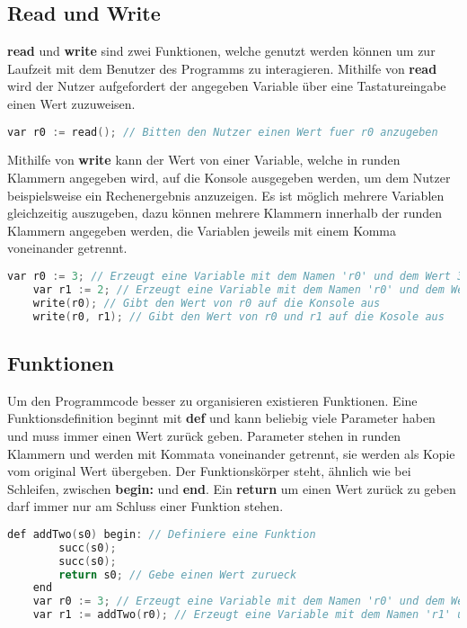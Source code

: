 \subsection{Read und Write}
\textbf{read} und \textbf{write} sind zwei Funktionen, welche genutzt werden können um zur Laufzeit mit dem Benutzer des Programms zu interagieren. Mithilfe von \textbf{read} wird der Nutzer aufgefordert der angegeben Variable über eine Tastatureingabe einen Wert zuzuweisen. 

\begin{lstlisting}[language=c, caption=read in While, label={lst:while-var-read}]
	var r0 := read(); // Bitten den Nutzer einen Wert fuer r0 anzugeben
\end{lstlisting}

Mithilfe von \textbf{write} kann der Wert von einer Variable, welche in runden Klammern angegeben wird, auf die Konsole ausgegeben werden, um dem Nutzer beispielsweise ein Rechenergebnis anzuzeigen. Es ist möglich mehrere Variablen gleichzeitig auszugeben, dazu können mehrere Klammern innerhalb der runden Klammern angegeben werden, die Variablen jeweils mit einem Komma voneinander getrennt. 

\begin{lstlisting}[language=c, caption=write in While, label={lst:while-write}]
	var r0 := 3; // Erzeugt eine Variable mit dem Namen 'r0' und dem Wert 3
	var r1 := 2; // Erzeugt eine Variable mit dem Namen 'r0' und dem Wert 3
	write(r0); // Gibt den Wert von r0 auf die Konsole aus
	write(r0, r1); // Gibt den Wert von r0 und r1 auf die Kosole aus
\end{lstlisting}

\subsection{Funktionen}
Um den Programmcode besser zu organisieren existieren Funktionen. Eine Funktionsdefinition beginnt mit \textbf{def} und kann beliebig viele Parameter haben und muss immer einen Wert zurück geben. Parameter stehen in runden Klammern und werden mit Kommata voneinander getrennt, sie werden als Kopie vom original Wert übergeben. Der Funktionskörper steht, ähnlich wie bei Schleifen, zwischen \textbf{begin:} und \textbf{end}. Ein \textbf{return} um einen Wert zurück zu geben darf immer nur am Schluss einer Funktion stehen. 

\begin{lstlisting}[language=c, caption=Funktionen in While, label={lst:while-function}]
	def addTwo(s0) begin: // Definiere eine Funktion
		succ(s0);
		succ(s0);
		return s0; // Gebe einen Wert zurueck
	end
	var r0 := 3; // Erzeugt eine Variable mit dem Namen 'r0' und dem Wert 3
	var r1 := addTwo(r0); // Erzeugt eine Variable mit dem Namen 'r1' und dem Wert von addTwo(r0)
\end{lstlisting}